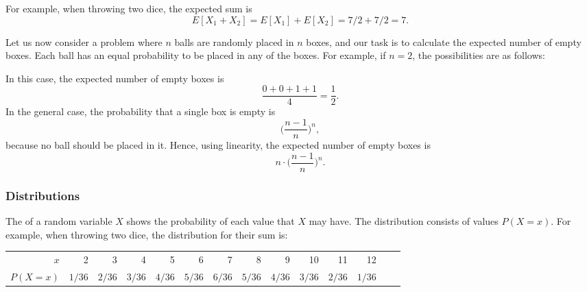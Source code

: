 For example, when throwing two dice,
the expected sum is
\[E[X_1+X_2]=E[X_1]+E[X_2]=7/2+7/2=7.\]

Let us now consider a problem where
$n$ balls are randomly placed in $n$ boxes,
and our task is to calculate the expected
number of empty boxes.
Each ball has an equal probability to
be placed in any of the boxes.
For example, if $n=2$, the possibilities
are as follows:
\begin{center}
\end{center}
In this case, the expected number of
empty boxes is
\[\frac{0+0+1+1}{4} = \frac{1}{2}.\]
In the general case, the probability that a
single box is empty is
\[\Big(\frac{n-1}{n}\Big)^n,\]
because no ball should be placed in it.
Hence, using linearity, the expected number of
empty boxes is
\[n \cdot \Big(\frac{n-1}{n}\Big)^n.\]

\subsubsection{Distributions}


The  of a random variable $X$
shows the probability of each value that
$X$ may have.
The distribution consists of values $P(X=x)$.
For example, when throwing two dice,
the distribution for their sum is:
\begin{center}
\small {
\begin{tabular}{r|rrrrrrrrrrrrr}
$x$ & 2 & 3 & 4 & 5 & 6 & 7 & 8 & 9 & 10 & 11 & 12 \\
$P(X=x)$ & $1/36$ & $2/36$ & $3/36$ & $4/36$ & $5/36$ & $6/36$ & $5/36$ & $4/36$ & $3/36$ & $2/36$ & $1/36$ \\
\end{tabular}
}
\end{center}

